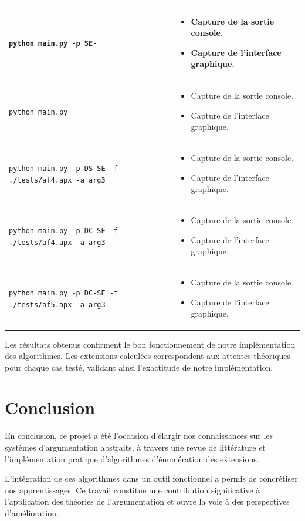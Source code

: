\documentclass{rapportECL}
\begin{document}
\begin{longtable}{|p{7cm}|p{7cm}|}
	
	\hline
	\texttt{python main.py -p SE-} & 
	\begin{itemize}
		\item Capture de la sortie console.
		\item Capture de l'interface graphique.
	\end{itemize} \\
	\hline
	\texttt{python main.py } & 
	\begin{itemize}
		\item Capture de la sortie console.
		\item Capture de l'interface graphique.
	\end{itemize} \\
	\hline
	\texttt{python main.py -p DS-SE -f ./tests/af4.apx -a arg3} & 
	\begin{itemize}
		\item Capture de la sortie console.
		\item Capture de l'interface graphique.
	\end{itemize} \\
	\hline
	\texttt{python main.py -p DC-SE -f ./tests/af4.apx -a arg3} & 
	\begin{itemize}
		\item Capture de la sortie console.
		\item Capture de l'interface graphique.
	\end{itemize} \\
	\hline
	\texttt{python main.py -p DC-SE -f ./tests/af5.apx -a arg3} & 
	\begin{itemize}
		\item Capture de la sortie console.
		\item Capture de l'interface graphique.
	\end{itemize} \\

	\end{longtable}




\vspace{0.5cm}
\noindent
Les résultats obtenus confirment le bon fonctionnement de notre implémentation des algorithmes. Les extensions calculées correspondent aux attentes théoriques pour chaque cas testé, validant ainsi l'exactitude de notre implémentation.


\section*{Conclusion}
En conclusion, ce projet a été l'occasion d'élargir nos connaissances sur les systèmes d'argumentation abstraits, 
à travers une revue de littérature et l'implémentation pratique d'algorithmes d'énumération des extensions. 

L'intégration de ces algorithmes dans un outil fonctionnel a permis de concrétiser nos apprentissages. 
Ce travail constitue une contribution significative à l'application des théories de l'argumentation et ouvre la voie à des perspectives d'amélioration.



 

\end{document}

